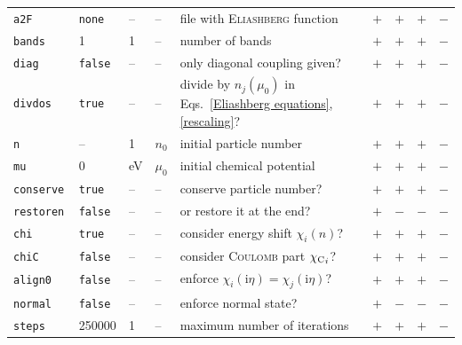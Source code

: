 \documentclass[a4paper]{article}
\def\I{\mathrm i}
\def\sub#1{\sb{\mathrm{#1}}}
\newlength\gap
\begin{document}
\begin{table}[b]
\begin{tabular}{*9l}
         \tt a2F           & \tt none    & --               & --                  & file with \textsc{Eliashberg} function     & $+$ & $+$ & $+$ & $-$ \\
         [\gap]
         \tt bands         & 1           & 1                & --                  & number of bands                            & $+$ & $+$ & $+$ & $-$ \\
         \tt diag          & \tt false   & --               & --                  & only diagonal coupling given?              & $+$ & $+$ & $+$ & $-$ \\
         \tt divdos        & \tt true  & -- & -- & divide by $n_j(\mu_0)$ in Eqs.~\ref{Eliashberg equations}, \ref{rescaling}? & $+$ & $+$ & $+$ & $-$ \\
         [\gap]
         \tt n             & --          & 1                & $n_0$               & initial particle number                    & $+$ & $+$ & $+$ & $-$ \\
         \tt mu            & 0           & eV               & $\mu_0$             & initial chemical potential                 & $+$ & $+$ & $+$ & $-$ \\
         \tt conserve      & \tt true    & --               & --                  & conserve particle number?                  & $+$ & $+$ & $+$ & $-$ \\
         \tt restoren      & \tt false   & --               & --                  & or restore it at the end?                  & $+$ & $-$ & $-$ & $-$ \\
         [\gap]
         \tt chi           & \tt true    & --               & --                  & consider energy shift $\chi_i(n)$?         & $+$ & $+$ & $+$ & $-$ \\
         \tt chiC          & \tt false   & --               & --           & consider \textsc{Coulomb} part ${\chi \sub C}_i$? & $+$ & $+$ & $+$ & $-$ \\
         \tt align0        & \tt false   & --               & --                & enforce $\chi_i(\I \eta) = \chi_j(\I \eta)$? & $+$ & $+$ & $+$ & $-$ \\
         \tt normal        & \tt false   & --               & --                  & enforce normal state?                      & $+$ & $-$ & $-$ & $-$ \\
         [\gap]
         \tt steps         & 250000      & 1                & --                  & maximum number of iterations               & $+$ & $+$ & $+$ & $-$ \\
         [\gap]

\end{tabular}
\end{table}
\end{document}
